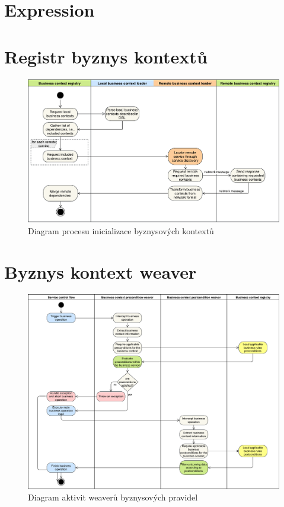 \section{Expression}

\section{Registr byznys kontextů}

\begin{figure}
    \centering
    \includegraphics[keepaspectratio=true, width=0.8\linewidth]{figures/business-context-loading.pdf}
    \caption{Diagram procesu inicializace byznysov\'ych kontextů}
    \label{fig:business-context-loading}
\end{figure} %

\section{Byznys kontext weaver}

\begin{figure}
    \centering
    \includegraphics[keepaspectratio=true, width=0.8\linewidth]{figures/business-rules-weaver.pdf}
    \caption{Diagram aktivit weaverů byznysov\'ych pravidel}
    \label{fig:business-rules-weaver}
\end{figure} %

